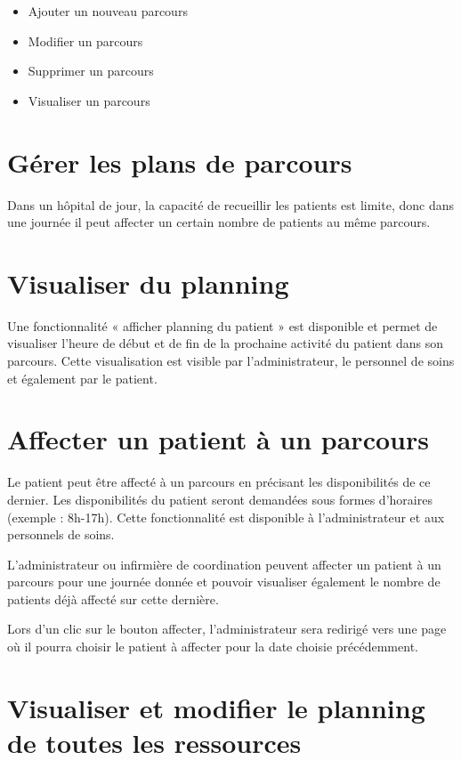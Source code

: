 \documentclass{polytech/polytech}
\begin{document}
\begin{itemize}
	\item Ajouter un nouveau parcours
	\item Modifier un parcours
	\item Supprimer un parcours
	\item Visualiser un parcours
\end{itemize}

\section{Gérer les plans de parcours}

Dans un hôpital de jour, la capacité de recueillir les patients est limite, donc dans une journée il peut affecter un certain nombre de patients au même parcours.

\section{Visualiser du planning}

Une fonctionnalité « afficher planning du patient » est disponible et permet de visualiser l’heure de début et de fin de la prochaine activité du patient dans son parcours. Cette visualisation est visible par l’administrateur, le personnel de soins et également par le patient.

\section{Affecter un patient à un parcours}


Le patient peut être affecté à un parcours en précisant les disponibilités de ce dernier. Les disponibilités du patient seront demandées sous formes d’horaires (exemple : 8h-17h). Cette fonctionnalité est disponible à l'administrateur et aux personnels de soins. 

L'administrateur ou infirmière de coordination peuvent affecter un patient à un parcours pour une journée donnée et pouvoir visualiser également le nombre de patients déjà affecté sur cette dernière.

Lors d'un clic sur le bouton affecter, l'administrateur sera redirigé vers une page où il pourra choisir le patient à affecter pour la date choisie précédemment.

\section{Visualiser et modifier le planning de toutes les ressources}
\end{document}
